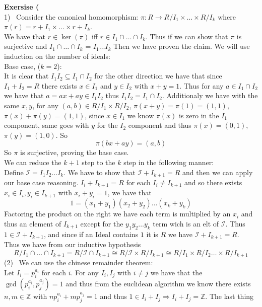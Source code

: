 \documentclass[12pt]{article}
\newenvironment{ques}[1]{\textbf{Exersise #1}\vspace{1 mm}\\ }{\bigskip}
\theoremstyle{definition}
\newcommand{\Z}{\mathbb Z}
\begin{document}
\begin{ques}{3.2}
	(1) \ Consider the canonical homomorphism: 
	$\pi : R \to R/I_1 \times \dots \times R/I_k$ where $\pi(r) = r + I_1
	\times \dots \times r + I_k$.\\
	We have that $r \in \ker(\pi)$ iff $r \in I_1 \cap \dots \cap I_k$. Thus if
	we can show that $\pi$ is surjective and $I_1 \cap \dots \cap I_k$ = $I_1
	\dots I_k$ Then we have proven the claim. We will use induction on the
	number of ideals:\\
	Base case, ($k=2$):\\
	It is clear that $I_1I_2 \subseteq I_1 \cap I_2$ for the other direction we
	have that since $I_1 + I_2 = R$ there exists $x \in I_1$ and $y \in I_2$
	with $x + y = 1$. Thus for any $a \in I_1 \cap I_2$ we have that $a = ax +
	ay \in I_1I_2$ thus $I_1I_2 = I_1 \cap I_2$. Additionaly we have with the same
	$x, y$, for any $(a, b) \in R/I_1 \times R/I_2$, $\pi(x + y) =
	\pi(1) = (1, 1)$, $\pi(x) + \pi(y) = (1, 1)$, since $x \in I_1$ we know
	$\pi(x)$ is zero in the $I_1$ component, same goes with $y$ for the $I_2$
	component and thus $\pi(x) = (0,1)$, $\pi(y) = (1,0)$. So
	$$\pi(bx + ay) =(a, b)$$
	So $\pi$ is surjective, proving the base case.\\
	We can reduce the $k+1$ step to the $k$ step in the following manner:\\
	Define $\mathcal I = I_1 I_2 \dots I_k$. We have to show that
	$\mathcal I + I_{k+1} = R$ and then we can apply our base case reasoning.
	$I_i + I_{k+1} = R$ for each $I_i \neq I_{k+1}$ and so there exists $x_i
	\in I_i, y_i \in I_{k+1}$ with $x_i + y_i = 1$, we have that
	$$1 = (x_1 + y_1)(x_2 + y_2) \dots (x_k + y_k)$$
	Factoring the product on the right we have each term is multiplied by an
	$x_i$ and thus an element of $I_{k+1}$ except for the $y_1y_2 \dots y_k$
	term wich is an elt of $\mathcal I$. Thus $1 \in \mathcal I + I_{k+1}$, and
	since if an Ideal contains $1$ it is $R$ we have $\mathcal I + I_{k+1} = R$.\\
	Thus we have from our inductive hypothesis
	$$R/I_1 \cap \dots \cap I_{k+1} = R/\mathcal I \cap I_{k+1} \cong
	R/\mathcal I \times R/I_{k+1} \cong R/ I_1 \times R/I_2 \dots \times R/I_{k+1} $$
	(2) \ We can use the chinese remainder theorem:\\
	Let $I_i = p_i^{a_i}$ for each $i$. For any $I_i, I_j$ with $i \neq j$ we
	have that the $\gcd (p_i^{a_i},p_j^{a_j}) = 1$ and thus from the euclidean
	algorithm we know there exists $n, m \in \Z$ with $np_i^{a_i} + mp_j^{a_j}
	= 1$ and thus $1 \in I_i + I_j \Rightarrow I_i + I_j = \Z$. The last thing

\end{ques}
\end{document}
